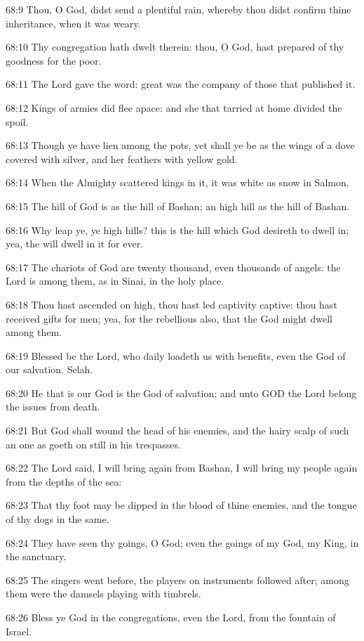 68:9 Thou, O God, didst send a plentiful rain, whereby thou didst confirm thine inheritance, when it was weary.

68:10 Thy congregation hath dwelt therein: thou, O God, hast prepared of thy goodness for the poor.

68:11 The Lord gave the word: great was the company of those that published it.

68:12 Kings of armies did flee apace: and she that tarried at home divided the spoil.

68:13 Though ye have lien among the pots, yet shall ye be as the wings of a dove covered with silver, and her feathers with yellow gold.

68:14 When the Almighty scattered kings in it, it was white as snow in Salmon.

68:15 The hill of God is as the hill of Bashan; an high hill as the hill of Bashan.

68:16 Why leap ye, ye high hills? this is the hill which God desireth to dwell in; yea, the \LORD will dwell in it for ever.

68:17 The chariots of God are twenty thousand, even thousands of angels: the Lord is among them, as in Sinai, in the holy place.

68:18 Thou hast ascended on high, thou hast led captivity captive: thou hast received gifts for men; yea, for the rebellious also, that the \LORD God might dwell among them.

68:19 Blessed be the Lord, who daily loadeth us with benefits, even the God of our salvation. Selah.

68:20 He that is our God is the God of salvation; and unto GOD the Lord belong the issues from death.

68:21 But God shall wound the head of his enemies, and the hairy scalp of such an one as goeth on still in his trespasses.

68:22 The Lord said, I will bring again from Bashan, I will bring my people again from the depths of the sea:

68:23 That thy foot may be dipped in the blood of thine enemies, and the tongue of thy dogs in the same.

68:24 They have seen thy goings, O God; even the goings of my God, my King, in the sanctuary.

68:25 The singers went before, the players on instruments followed after; among them were the damsels playing with timbrels.

68:26 Bless ye God in the congregations, even the Lord, from the fountain of Israel.

